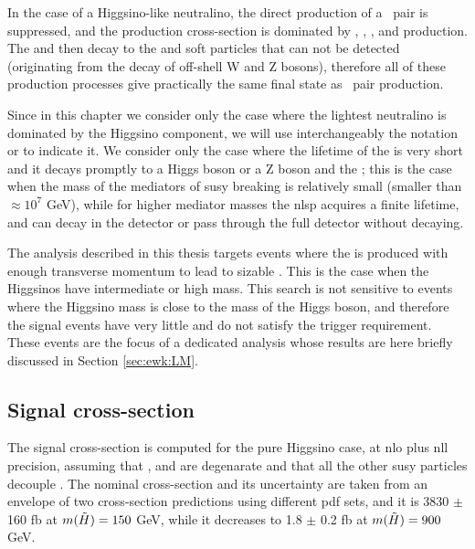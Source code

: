 In the case of a Higgsino-like neutralino, the direct production of a \ninoone\ninoone\ pair is suppressed, and the production cross-section is dominated by 
\ninoone\ninotwo, \ninoone\chinoonepm, \ninotwo\chinoonepm, and \chinoonep\chinoonem production.
The \ninotwo and \chinoonepm then decay to the \ninoone and soft particles that can not be detected (originating from the 
decay of off-shell W and Z bosons), therefore all of these production processes give practically the same final state as 
\ninoone\ninoone\  pair production. 

Since in this chapter we consider only the case where the lightest neutralino is dominated by the Higgsino component,
we will use interchangeably the notation \ninoone or \hino to indicate it.  
We consider only the case where the lifetime of the \hino is very short and it decays promptly to a Higgs boson or a Z boson and the \gravino;
this is the case when the mass of the mediators of \gls{susy} breaking is relatively small (smaller than $\approx 10^7$ GeV), 
while for higher mediator masses the \gls{nlsp} acquires a finite lifetime, and can decay in the detector or pass
 through the full detector without decaying. 

The analysis described in this thesis targets events where the \gravino is produced with enough transverse momentum to lead to 
sizable \met. This is the case when the Higgsinos have intermediate or high mass.
This search is not sensitive to events where the Higgsino mass is close to the mass of the Higgs boson, and therefore 
the signal events have very little \met and do not satisfy the \met trigger requirement.
These events are the focus of a dedicated analysis whose results are here briefly discussed in Section \ref{sec:ewk:LM}.


\subsection{Signal cross-section}

The signal cross-section is computed for the pure Higgsino case, at \gls{nlo} plus \gls{nll} precision, assuming that
\ninoone, \ninotwo and \chinoonepm are degenarate and that all the other \gls{susy} particles decouple \cite{Fuks:2012qx,Fuks:2013vua}.
The nominal cross-section and its uncertainty are taken from an envelope of two cross-section predictions using different \gls{pdf} sets, 
and it is 3830 $\pm$ 160 fb at $m(\tilde{H}) = 150$ GeV, while it decreases to 1.8 $\pm$ 0.2 fb at $m(\tilde{H}) = 900$ GeV. 

